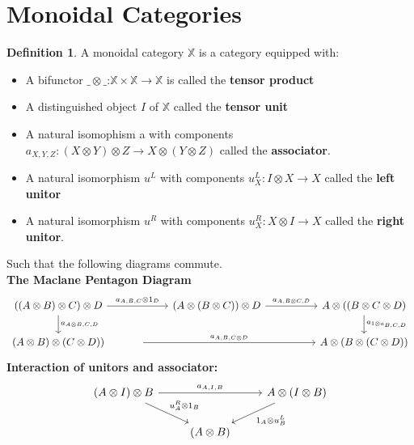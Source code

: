 \documentclass[11pt, oneside]{amsart}
\theoremstyle{definition}
\newtheorem{definition}{Definition}[section]
\theoremstyle{definition}
\begin{document}
\section{Monoidal Categories}
\theoremstyle{definition}
\begin{definition}
A monoidal category $\mathbb{X}$ is a category equipped with:
\begin{itemize}
    \item A bifunctor $\_\otimes{\_}$:$\mathbb{X}\times{\mathbb{X}}\to \mathbb{X}$ is called the \textbf{tensor product}
    \item A distinguished object $I$ of $\mathbb{X}$ called the \textbf{tensor unit}
    \item A natural isomophism a with components $a_{X,Y,Z}:(X\otimes{Y})\otimes{Z} \to X\otimes({Y}\otimes{Z})$ called the \textbf{associator}.
    \item A natural isomorphism $u^{L}$ with components ${u^{L}_{X}}: I\otimes{X}\to X$ called the \textbf{left unitor}
    \item A natural isomorphism $u^{R}$ with components ${u^{R}_{X}}: X\otimes{I}\to X$ called the \textbf{right unitor}.
\end{itemize}
\end{definition}
Such that the following diagrams commute.\\

\textbf{The Maclane Pentagon Diagram}
\begin{equation*}
\centering
\begin{tikzcd}
(({A}\otimes{B})\otimes{C})\otimes{D} \arrow[rr, "{a_{A,B,C}\otimes{1_{D}}}"] \arrow[d, "{a_{A\otimes{B}, C, D}}"] &                                           & (A\otimes{(B\otimes{C}))\otimes{D}} \arrow[rr, "{a_{A,{B\otimes{C},D}}}"] &  & {A}\otimes((B\otimes{C}\otimes{D}) \arrow[d, "{a_{1\otimes{a}_{B, C, D}}}"] \\
(A\otimes{B})\otimes(C\otimes{D}))                                                                                 & {} \arrow[rrr, "{a_{A, B, C\otimes{D}}}"] &                                                                           &  & A\otimes{(B\otimes(C\otimes{D}))}                                          
\end{tikzcd}
\end{equation*}
\textbf{Interaction of unitors and associator:}
\begin{equation*}
\begin{tikzcd}
({A}\otimes{I})\otimes{B} \arrow[rr, "{a_{A,I,B}}"] \arrow[rd, "{u^{R}_{A}}\otimes{1_{B}}"] &               & {A}\otimes({I}\otimes{B}) \arrow[ld, "1_{A}\otimes{{u^{L}_B}}"] \\
                                                                                            & (A\otimes{B}) &                                                                
\end{tikzcd} 
\end{equation*}
\end{document}
